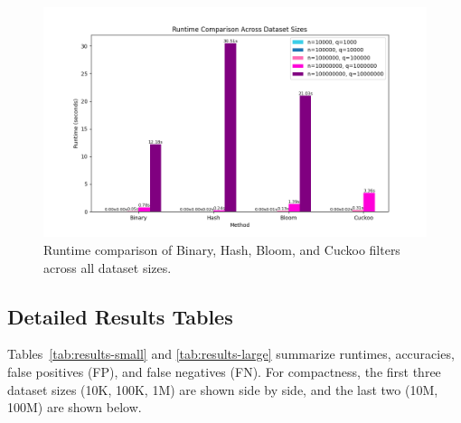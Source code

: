 \documentclass[acmsmall]{acmart}
\begin{document}
\begin{figure}[H]
    \centering
    \includegraphics[width=0.8\linewidth]{plots/other_plot.png}
    \caption{Runtime comparison of Binary, Hash, Bloom, and Cuckoo filters across all dataset sizes.}
    \label{fig:other-runtime}
\end{figure}

\subsection{Detailed Results Tables}

Tables~\ref{tab:results-small} and \ref{tab:results-large} summarize runtimes, accuracies, false positives (FP), and false negatives (FN). For compactness, the first three dataset sizes (10K, 100K, 1M) are shown side by side, and the last two (10M, 100M) are shown below.
\end{document}
